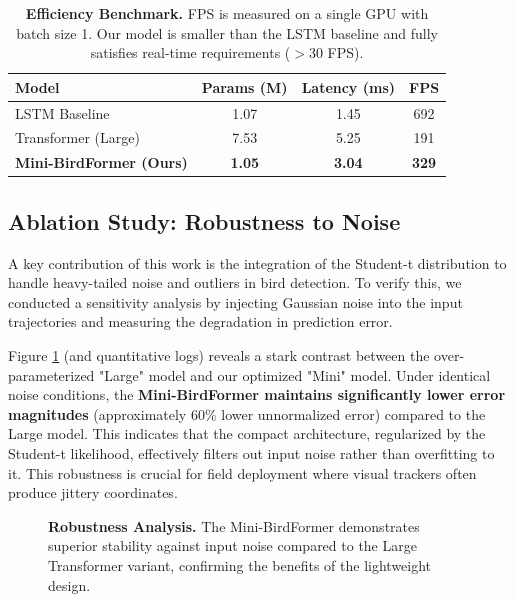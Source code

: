 \documentclass[11pt]{article}
\begin{document}
\begin{table}[h]
	\centering
	\caption{\textbf{Efficiency Benchmark.} FPS is measured on a single GPU with batch size 1. Our model is smaller than the LSTM baseline and fully satisfies real-time requirements ($>30$ FPS).}
	\label{tab:efficiency}
	\begin{tabular}{lccc}
		\toprule
		\textbf{Model} & \textbf{Params (M)} & \textbf{Latency (ms)} & \textbf{FPS} \\ \midrule
		LSTM Baseline & 1.07 & 1.45 & 692 \\
		Transformer (Large) & 7.53 & 5.25 & 191 \\
		\textbf{Mini-BirdFormer (Ours)} & \textbf{1.05} & \textbf{3.04} & \textbf{329} \\ \bottomrule
	\end{tabular}
\end{table}

\subsection{Ablation Study: Robustness to Noise}
A key contribution of this work is the integration of the Student-t distribution to handle heavy-tailed noise and outliers in bird detection. To verify this, we conducted a sensitivity analysis by injecting Gaussian noise into the input trajectories and measuring the degradation in prediction error.

Figure \ref{fig:robustness} (and quantitative logs) reveals a stark contrast between the over-parameterized "Large" model and our optimized "Mini" model. Under identical noise conditions, the \textbf{Mini-BirdFormer maintains significantly lower error magnitudes} (approximately $60\%$ lower unnormalized error) compared to the Large model. This indicates that the compact architecture, regularized by the Student-t likelihood, effectively filters out input noise rather than overfitting to it. This robustness is crucial for field deployment where visual trackers often produce jittery coordinates.

\begin{figure}[h]
	\centering
	\caption{\textbf{Robustness Analysis.} The Mini-BirdFormer demonstrates superior stability against input noise compared to the Large Transformer variant, confirming the benefits of the lightweight design.}
	\label{fig:robustness}
\end{figure}
\end{document}
